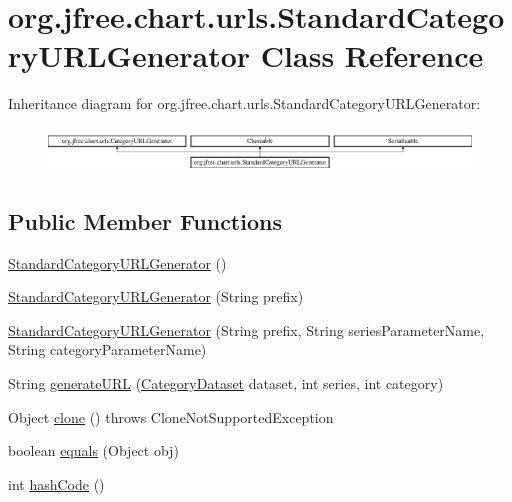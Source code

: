 \hypertarget{classorg_1_1jfree_1_1chart_1_1urls_1_1_standard_category_u_r_l_generator}{}\section{org.\+jfree.\+chart.\+urls.\+Standard\+Category\+U\+R\+L\+Generator Class Reference}
\label{classorg_1_1jfree_1_1chart_1_1urls_1_1_standard_category_u_r_l_generator}
Inheritance diagram for org.\+jfree.\+chart.\+urls.\+Standard\+Category\+U\+R\+L\+Generator\+:\begin{figure}[H]
\begin{center}
\leavevmode
\includegraphics[height=1.188960cm]{classorg_1_1jfree_1_1chart_1_1urls_1_1_standard_category_u_r_l_generator}
\end{center}
\end{figure}
\subsection*{Public Member Functions}
\begin{DoxyCompactItemize}
\item 
\mbox{\hyperlink{classorg_1_1jfree_1_1chart_1_1urls_1_1_standard_category_u_r_l_generator_aff1196cab86c00e4bd43958893fecc42}{Standard\+Category\+U\+R\+L\+Generator}} ()
\item 
\mbox{\hyperlink{classorg_1_1jfree_1_1chart_1_1urls_1_1_standard_category_u_r_l_generator_a9f2d58a4e08d408b62d074dbd9557cf9}{Standard\+Category\+U\+R\+L\+Generator}} (String prefix)
\item 
\mbox{\hyperlink{classorg_1_1jfree_1_1chart_1_1urls_1_1_standard_category_u_r_l_generator_a4f2910f6ce783766e491e93650e0c572}{Standard\+Category\+U\+R\+L\+Generator}} (String prefix, String series\+Parameter\+Name, String category\+Parameter\+Name)
\item 
String \mbox{\hyperlink{classorg_1_1jfree_1_1chart_1_1urls_1_1_standard_category_u_r_l_generator_a19d20c20c7f0f94dd28cef1c3c1cc01c}{generate\+U\+RL}} (\mbox{\hyperlink{interfaceorg_1_1jfree_1_1data_1_1category_1_1_category_dataset}{Category\+Dataset}} dataset, int series, int category)
\item 
Object \mbox{\hyperlink{classorg_1_1jfree_1_1chart_1_1urls_1_1_standard_category_u_r_l_generator_ac9f26b6d5d6119a309e2d9d4b967843c}{clone}} ()  throws Clone\+Not\+Supported\+Exception 
\item 
boolean \mbox{\hyperlink{classorg_1_1jfree_1_1chart_1_1urls_1_1_standard_category_u_r_l_generator_a7f8ae12934743acf69a34ae12938f2ef}{equals}} (Object obj)
\item 
int \mbox{\hyperlink{classorg_1_1jfree_1_1chart_1_1urls_1_1_standard_category_u_r_l_generator_a68b3a2814d60f264fe067cdc2c49cbf1}{hash\+Code}} ()
\end{DoxyCompactItemize}


